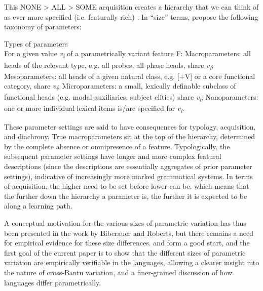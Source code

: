 \documentclass[output=paper]{langsci/langscibook}
\begin{document}
This NONE > ALL > SOME acquisition creates a hierarchy that we can think of as
ever more specified (i.e. featurally rich) . In “size” terms,
\textcite{BibRob2015,BibRob2016} propose the following taxonomy of parameters:

\ea\label{ex:key:3.6} Types of parameters\\
    \sn For a given value \emph{v\textsubscript{i}} of a parametrically variant
    feature F:
    \ea Macroparameters: all heads of the relevant type, e.g. all probes, all
    phase heads, share \emph{v\textsubscript{i}};
    \ex Mesoparameters: all heads of a given natural class, e.g. [+V] or a core
    functional category, share \emph{v\textsubscript{i}};
    \ex Microparameters: a small, lexically definable subclass of functional
    heads (e.g. modal auxiliaries, subject clitics) share
    \emph{v\textsubscript{i}};
    \ex Nanoparameters: one or more individual lexical items is/are specified
    for \emph{v\textsubscript{i}}.
    \z
\z

These parameter settings are said to have consequences for typology,
acquisition, and diachrony. True macroparameters sit at the top of the
hierarchy, determined by the complete absence or omnipresence of a feature.
Typologically, the subsequent parameter settings have longer and more complex
featural descriptions (since the descriptions are essentially aggregates of
prior parameter settings), indicative of increasingly more marked grammatical
systems. In terms of acquisition, the higher  need to be set before
lower  can be, which means that the further down the hierarchy a
parameter is, the further it is expected to be along a learning path.

A conceptual motivation for the various sizes of parametric variation has thus
been presented in the work by Biberauer and Roberts, but there remains a need
for empirical evidence for these size differences.
\textcite{BibRob2012,BibRob2016} and \citet{Ledgeway2013} form a good start,
and the first goal of the current paper is to show that the different sizes of
parametric variation are empirically verifiable in the  languages,
allowing a clearer insight into the nature of cross-Bantu variation, and a
finer-grained discussion of how languages differ parametrically.
\end{document}
